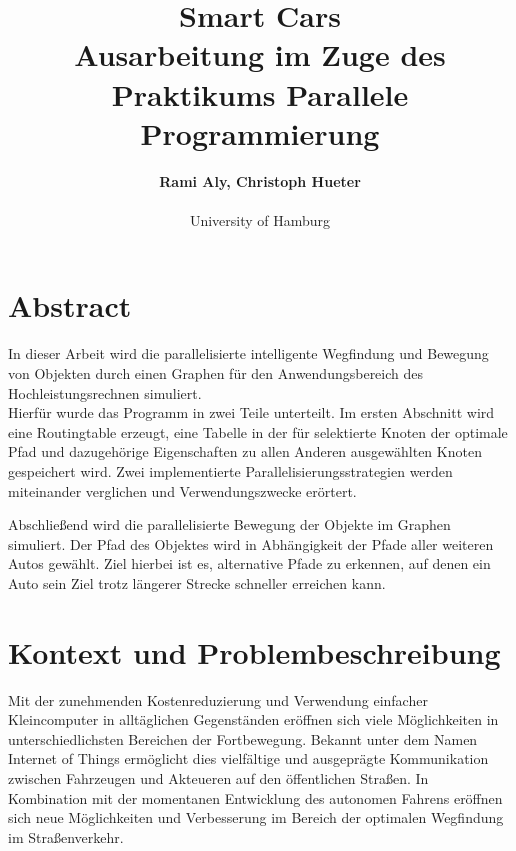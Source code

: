 \documentclass[paper=A4,pagesize=auto,12pt,headinclude=true,footinclude=true,BCOR=0mm,DIV=calc]{scrartcl}
\begin{document}
	
	\title{Smart Cars\\
	\small{Ausarbeitung im Zuge des Praktikums Parallele Programmierung}}
	\author{\textbf{Rami Aly, Christoph Hueter}\\
	\\University of Hamburg}

	\maketitle
	
	\newpage
	
	\section{Abstract}
	In dieser Arbeit wird die parallelisierte intelligente Wegfindung und Bewegung von Objekten durch einen Graphen für den Anwendungsbereich des Hochleistungsrechnen simuliert.\\
	
	Hierfür wurde das Programm in zwei Teile unterteilt. Im ersten Abschnitt wird eine Routingtable erzeugt, eine Tabelle in der für selektierte Knoten der optimale Pfad und dazugehörige Eigenschaften zu allen Anderen ausgewählten Knoten gespeichert wird. Zwei implementierte Parallelisierungsstrategien werden miteinander verglichen und Verwendungszwecke erörtert.
	
	Abschließend wird die parallelisierte Bewegung der Objekte im Graphen simuliert. Der Pfad des Objektes wird in Abhängigkeit der Pfade aller weiteren Autos gewählt. Ziel hierbei ist es, alternative Pfade zu erkennen, auf denen ein Auto sein Ziel trotz längerer Strecke schneller erreichen kann.
	
	
	\newpage
	
	\tableofcontents 
	
	\newpage
	\section{Kontext und Problembeschreibung}
	Mit der zunehmenden Kostenreduzierung und Verwendung einfacher Kleincomputer in alltäglichen Gegenständen eröffnen sich viele Möglichkeiten in unterschiedlichsten Bereichen der Fortbewegung. Bekannt unter dem Namen Internet of Things ermöglicht dies vielfältige und ausgeprägte Kommunikation zwischen Fahrzeugen und Akteueren auf den öffentlichen Straßen. In Kombination mit der momentanen Entwicklung des autonomen Fahrens eröffnen sich neue Möglichkeiten und Verbesserung im Bereich der optimalen Wegfindung im Straßenverkehr.
	
\end{document}
